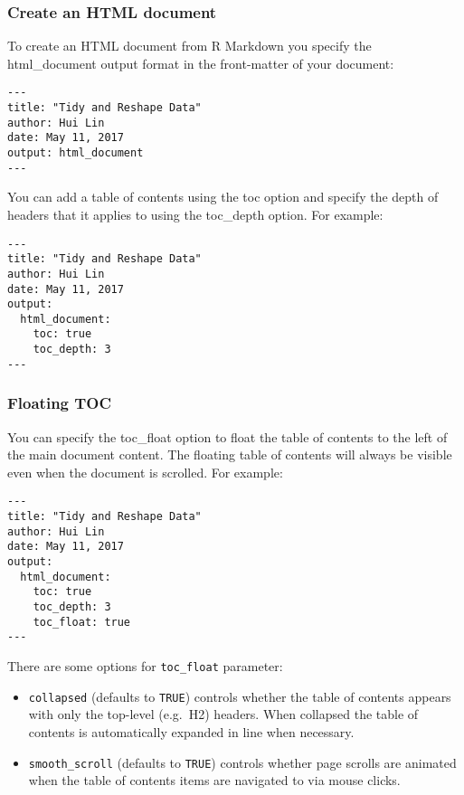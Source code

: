 \documentclass[
]{article}
\begin{document}
\hypertarget{create-an-html-document}{%
\subsubsection{Create an HTML document}\label{create-an-html-document}}

To create an HTML document from R Markdown you specify the
html\_document output format in the front-matter of your document:

\begin{verbatim}
---
title: "Tidy and Reshape Data"
author: Hui Lin
date: May 11, 2017
output: html_document
---
\end{verbatim}

You can add a table of contents using the toc option and specify the
depth of headers that it applies to using the toc\_depth option. For
example:

\begin{verbatim}
---
title: "Tidy and Reshape Data"
author: Hui Lin
date: May 11, 2017
output:
  html_document:
    toc: true
    toc_depth: 3
---
\end{verbatim}

\hypertarget{floating-toc}{%
\subsubsection{Floating TOC}\label{floating-toc}}

You can specify the toc\_float option to float the table of contents to
the left of the main document content. The floating table of contents
will always be visible even when the document is scrolled. For example:

\begin{verbatim}
---
title: "Tidy and Reshape Data"
author: Hui Lin
date: May 11, 2017
output:
  html_document:
    toc: true
    toc_depth: 3
    toc_float: true
---
\end{verbatim}

There are some options for \texttt{toc\_float} parameter:

\begin{itemize}
\item
  \texttt{collapsed} (defaults to \texttt{TRUE}) controls whether the
  table of contents appears with only the top-level (e.g.~H2) headers.
  When collapsed the table of contents is automatically expanded in line
  when necessary.
\item
  \texttt{smooth\_scroll} (defaults to \texttt{TRUE}) controls whether
  page scrolls are animated when the table of contents items are
  navigated to via mouse clicks.
\end{itemize}
\end{document}
